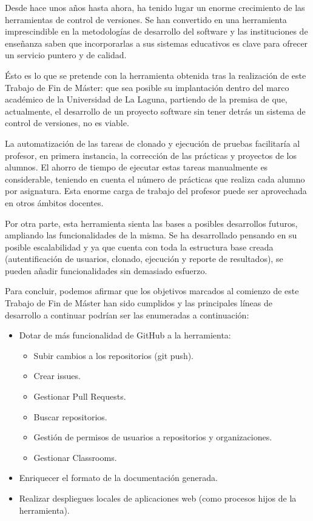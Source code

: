 

Desde hace unos años hasta ahora, ha tenido lugar un enorme crecimiento de las herramientas de control de versiones. Se han convertido en una herramienta imprescindible en la metodologías de desarrollo del software y las instituciones de enseñanza saben que incorporarlas a sus sistemas educativos es clave para ofrecer un servicio puntero y de calidad.
\bigskip

Ésto es lo que se pretende con la herramienta obtenida tras la realización de este Trabajo de Fin de Máster: que sea posible su implantación dentro del marco académico de la Universidad de La Laguna, partiendo de la premisa de que, actualmente, el desarrollo de un proyecto software sin tener detrás un sistema de control de versiones, no es viable.
\bigskip

La automatización de las tareas de clonado y ejecución de pruebas facilitaría al profesor, en primera instancia, la corrección de las prácticas y proyectos de los alumnos. El ahorro de tiempo de ejecutar estas tareas manualmente es considerable, teniendo en cuenta el número de prácticas que realiza cada alumno por asignatura. Esta enorme carga de trabajo del profesor puede ser aprovechada en otros ámbitos docentes.
\bigskip

Por otra parte, esta herramienta sienta las bases a posibles desarrollos futuros, ampliando las funcionalidades de la misma. Se ha desarrollado pensando en su posible escalabilidad y ya que cuenta con toda la estructura base creada (autentificación de usuarios, clonado, ejecución y reporte de resultados), se pueden añadir funcionalidades sin demasiado esfuerzo.
\newpage

Para concluir, podemos afirmar que los objetivos marcados al comienzo de este Trabajo de Fin de Máster han sido cumplidos y las principales líneas de desarrollo a continuar podrían ser las enumeradas a
continuación:  

\begin{itemize}
	\item Dotar de más funcionalidad de GitHub a la herramienta:
	\begin{itemize}
		\item Subir cambios a los repositorios (git push).
		\item Crear issues.
		\item Gestionar Pull Requests.
		\item Buscar repositorios.
		\item Gestión de permisos de usuarios a repositorios y organizaciones.
		\item Gestionar Classrooms.
	\end{itemize}
	\item Enriquecer el formato de la documentación generada.
	\item Realizar despliegues locales de aplicaciones web (como procesos hijos de la herramienta).
\end{itemize}

